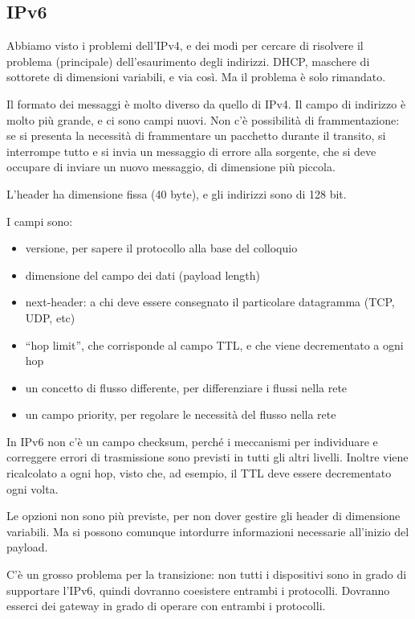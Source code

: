 \subsection{IPv6}

Abbiamo visto i problemi dell'IPv4, e dei modi per cercare di risolvere il problema (principale) dell'esaurimento degli indirizzi. DHCP, maschere di sottorete di dimensioni variabili, e via cos\`i. Ma il problema \`e solo rimandato.

Il formato dei messaggi \`e molto diverso da quello di IPv4. Il campo di indirizzo \`e molto pi\`u grande, e ci sono campi nuovi. Non c'\`e possibilit\`a di frammentazione: se si presenta la necessit\`a di frammentare un pacchetto durante il transito, si interrompe tutto e si invia un messaggio di errore alla sorgente, che si deve occupare di inviare un nuovo messaggio, di dimensione pi\`u piccola.

L'header ha dimensione fissa (40 byte), e gli indirizzi sono di 128 bit.

I campi sono:
\begin{itemize}
    \item versione, per sapere il protocollo alla base del colloquio
    \item dimensione del campo dei dati (payload length)
    \item next-header: a chi deve essere consegnato il particolare datagramma (TCP, UDP, etc)
    \item ``hop limit'', che corrisponde al campo TTL, e che viene decrementato a ogni hop
    \item un concetto di flusso differente, per differenziare i flussi nella rete
    \item un campo priority, per regolare le necessit\`a del flusso nella rete
\end{itemize}

In IPv6 non c'\`e un campo checksum, perch\'e i meccanismi per individuare e correggere errori di trasmissione sono previsti in tutti gli altri livelli. Inoltre viene ricalcolato a ogni hop, visto che, ad esempio, il TTL deve essere decrementato ogni volta.

Le opzioni non sono pi\`u previste, per non dover gestire gli header di dimensione variabili. Ma si possono comunque intordurre informazioni necessarie all'inizio del payload.

C'\`e un grosso problema per la transizione: non tutti i dispositivi sono in grado di supportare l'IPv6, quindi dovranno coesistere entrambi i protocolli. Dovranno esserci dei gateway in grado di operare con entrambi i protocolli.

